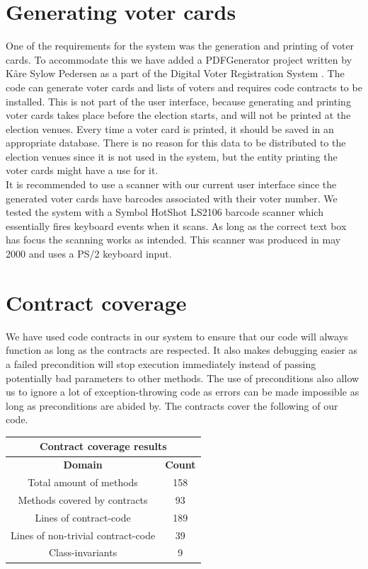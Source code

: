 \documentclass[a4paper]{report}
\begin{document}
\section{Generating voter cards}
One of the requirements for the system was the generation and printing of voter cards. To accommodate this we have added a PDFGenerator project written by K\aa re Sylow Pedersen as a part of the Digital Voter Registration System \cite{dvrs}. The code can generate voter cards and lists of voters and requires code contracts to be installed. This is not part of the user interface, because generating and printing voter cards takes place before the election starts, and will not be printed at the election venues. Every time a voter card is printed, it should be saved in an appropriate database. There is no reason for this data to be distributed to the election venues since it is not used in the system, but the entity printing the voter cards might have a use for it. \\

It is recommended to use a scanner with our current user interface since the generated voter cards have barcodes associated with their voter number. We tested the system with a Symbol HotShot LS2106 barcode scanner which essentially fires keyboard events when it scans. As long as the correct text box has focus the scanning works as intended. This scanner was produced in may 2000 and uses a PS/2 keyboard input. 

\section{Contract coverage}
We have used code contracts in our system to ensure that our code will always function as long as the contracts are respected. It also makes debugging easier as a failed precondition will stop execution immediately instead of passing potentially bad parameters to other methods. The use of preconditions also allow us to ignore a lot of exception-throwing code as errors can be made impossible as long as preconditions are abided by. The contracts cover the following of our code.

\noindent 
\begin{table}[ht]
\centering
\begin{tabular}{|c|c|}
\multicolumn{2}{c}{Contract coverage results}\\\hline
\textbf{Domain} & \textbf{Count}\\\hline
Total amount of methods & 158 \\
Methods covered by contracts & 93 \\
Lines of contract-code & 189\\
Lines of non-trivial contract-code & 39\\
Class-invariants & 9\\\hline
\end{tabular} 
\end{table}\\ 
\end{document}
